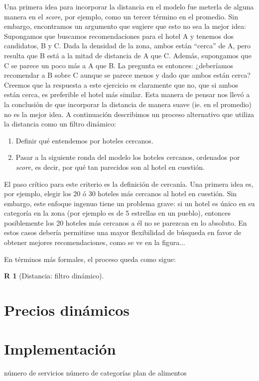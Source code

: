 \documentclass[12pt]{report}
\newtheorem{regla}{R}%
\begin{document}
Una primera idea para incorporar la distancia en el modelo fue meterla de alguna manera en el \emph{score}, por ejemplo, como un tercer término en el promedio. Sin embargo, encontramos un argumento que sugiere que esto no sea la mejor idea: Supongamos que buscamos recomendaciones para el hotel A y tenemos dos candidatos, B y C. Dada la densidad de la zona, ambos están ``cerca'' de A, pero resulta que B está a la mitad de distancia de A que C. Además, supongamos que C se parece un poco más a A que B. La pregunta es entonces: ¿deberíamos recomendar a B sobre C aunque se parece menos y dado que ambos están cerca? Creemos que la respuesta a este ejercicio es claramente que no, que si ambos están cerca, es preferible el hotel más similar. Esta manera de pensar nos llevó a la conclusión de que incorporar la distancia de manera suave (ie. en el promedio) no es la mejor idea. A continuación describimos un proceso alternativo que utiliza la distancia como un filtro dinámico:
\begin{enumerate}
	\item Definir qué entendemos por hoteles cercanos.
	\item Pasar a la siguiente ronda del modelo los hoteles cercanos, ordenados por \emph{score}, es decir, por qué tan parecidos son al hotel en cuestión.
\end{enumerate}
El paso crítico para este criterio es la definición de cercanía. Una primera idea es, por ejemplo, elegir los 20 ó 30 hoteles más cercanos al hotel en cuestión. Sin embargo, este enfoque ingenuo tiene un problema grave: si un hotel es único en su categoría en la zona (por ejemplo es de 5 estrellas en un pueblo), entonces posiblemente los 20 hoteles más cercanos a él no se parezcan en lo absoluto. En estos casos debería permitirse una mayor flexibilidad de búsqueda en favor de obtener mejores recomendaciones, como se ve en la figura...

En términos más formales, el proceso queda como sigue:
\begin{regla}[Distancia: filtro dinámico]
\end{regla}

\section{Precios dinámicos}
\section{Implementación}
número de servicios
número de categorías
plan de alimentos
\end{document}
